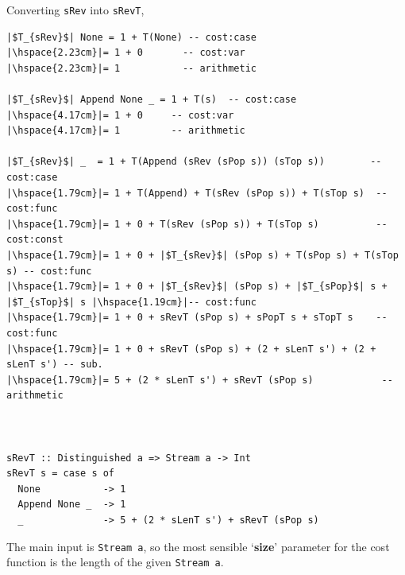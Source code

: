 \documentclass[12pt]{article}
\newcommand{\haskell}{\texttt}
\begin{document}
Converting \haskell{sRev} into \haskell{sRevT},
\begin{mdframed}
\begin{verbatim}
|$T_{sRev}$| None = 1 + T(None) -- cost:case
|\hspace{2.23cm}|= 1 + 0       -- cost:var
|\hspace{2.23cm}|= 1           -- arithmetic

|$T_{sRev}$| Append None _ = 1 + T(s)  -- cost:case
|\hspace{4.17cm}|= 1 + 0     -- cost:var
|\hspace{4.17cm}|= 1         -- arithmetic

|$T_{sRev}$| _  = 1 + T(Append (sRev (sPop s)) (sTop s))        -- cost:case
|\hspace{1.79cm}|= 1 + T(Append) + T(sRev (sPop s)) + T(sTop s)  -- cost:func
|\hspace{1.79cm}|= 1 + 0 + T(sRev (sPop s)) + T(sTop s)          -- cost:const
|\hspace{1.79cm}|= 1 + 0 + |$T_{sRev}$| (sPop s) + T(sPop s) + T(sTop s) -- cost:func
|\hspace{1.79cm}|= 1 + 0 + |$T_{sRev}$| (sPop s) + |$T_{sPop}$| s + |$T_{sTop}$| s |\hspace{1.19cm}|-- cost:func
|\hspace{1.79cm}|= 1 + 0 + sRevT (sPop s) + sPopT s + sTopT s    -- cost:func
|\hspace{1.79cm}|= 1 + 0 + sRevT (sPop s) + (2 + sLenT s') + (2 + sLenT s') -- sub.
|\hspace{1.79cm}|= 5 + (2 * sLenT s') + sRevT (sPop s)            -- arithmetic



sRevT :: Distinguished a => Stream a -> Int
sRevT s = case s of
  None           -> 1
  Append None _  -> 1
  _              -> 5 + (2 * sLenT s') + sRevT (sPop s)
\end{verbatim}
\end{mdframed}

The main input is \haskell{Stream a}, so the most sensible `\textbf{size}' parameter for the cost function is the length of the given \haskell{Stream a}.
\end{document}
